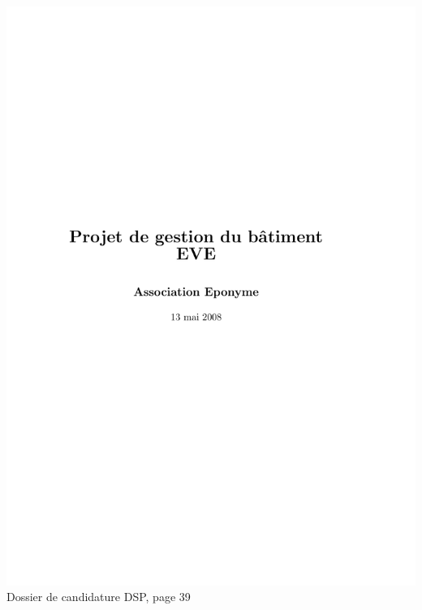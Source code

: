 \includegraphics[scale=0.85,trim=20mm 20mm 20mm 20mm,clip,page=39]{annexes/candidature_dsp.pdf} \\
Dossier de candidature DSP, page 39
\newpage
